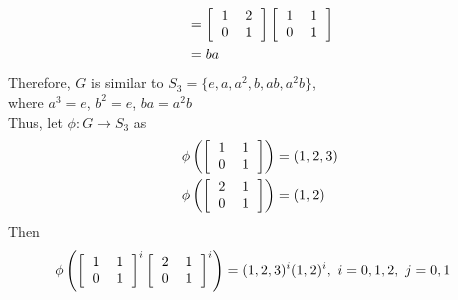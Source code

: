 \documentclass[paper=usletter, fontsize=12pt]{article}
\begin{document}
\begin{itemize}
\begin{itemize}
\begin{cproof}
\begin{align*}
                    & = \left[\begin{tabular}{cc}
                            1 & 2 \\
                            0 & 1
                    \end{tabular}\right]\left[\begin{tabular}{cc}
                            1 & 1 \\
                            0 & 1
                    \end{tabular}\right]\\
                    & = ba
                \end{align*}
                \endgroup
                Therefore, $G$ is similar to $S_3=\{e,a,a^2,b,ab,a^2b\}$,\\
                where $a^3=e$, $b^2=e$, $ba=a^2b$\\

                Thus, let $\phi: G \rightarrow S_3$ as
                \begin{align*}
                    \phi\left(\left[\begin{tabular}{cc}
                            1 & 1 \\
                            0 & 1
                    \end{tabular}\right]\right) & = (1,2,3)\\
                    \phi\left(\left[\begin{tabular}{cc}
                            2 & 1 \\
                            0 & 1
                    \end{tabular}\right]\right) & = (1,2)
                \end{align*}
                \endgroup
                Then
                \begin{align*}
                    \phi\left(\left[\begin{tabular}{cc}
                            1 & 1 \\
                            0 & 1
                    \end{tabular}\right]^i\left[\begin{tabular}{cc}
                            2 & 1 \\
                            0 & 1
                    \end{tabular}\right]^i\right) & = (1,2,3)^i(1,2)^i, \ i = 0,1,2, \ j = 0,1
                \end{align*}
                \endgroup


\end{cproof}
\end{itemize}
\end{itemize}
\end{document}
